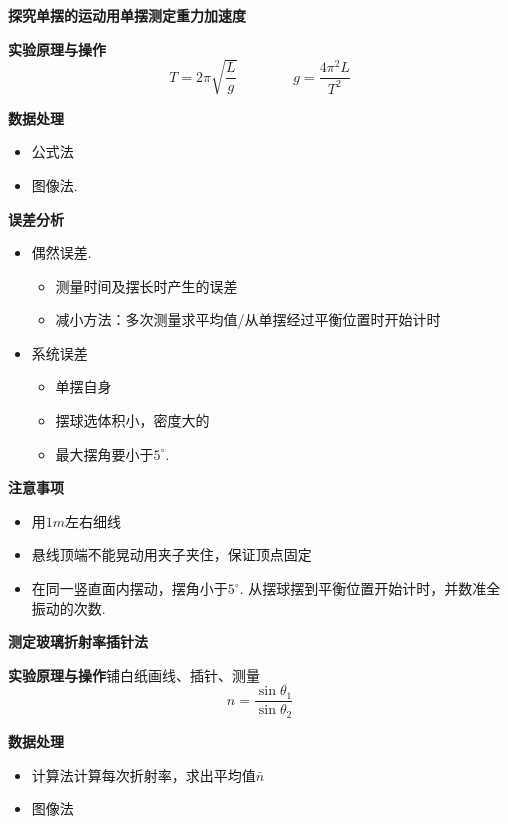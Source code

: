 \textbf{探究单摆的运动\quad 用单摆测定重力加速度}

\textbf{实验原理与操作}
\[ T=2\pi\sqrt{\frac{L}{g}}\qquad\qquad g=\frac{4\pi^{2}L}{T^{2}} \]

\textbf{数据处理}
\begin{itemize}
\item 公式法
\item 图像法.
\end{itemize}

\textbf{误差分析}
\begin{itemize}
\item 偶然误差.
 \begin{itemize}
 \item 测量时间及摆长时产生的误差
 \item 减小方法：多次测量求平均值/从单摆经过平衡位置时开始计时
 \end{itemize}
\item 系统误差
 \begin{itemize}
 \item 单摆自身
 \item 摆球选体积小，密度大的
 \item 最大摆角要小于$5^\circ$.
 \end{itemize}
\end{itemize}

\textbf{注意事项}
\begin{itemize}
\item 用$1\unit{m}$左右细线
\item 悬线顶端不能晃动用夹子夹住，保证顶点固定
\item 在同一竖直面内摆动，摆角小于$5^\circ$. 从摆球摆到平衡位置开始计时，并数准全振动的次数.
\end{itemize}
\textbf{测定玻璃折射率\quad 插针法}

\textbf{实验原理与操作}\quad 铺白纸画线、插针、测量
\[ n=\frac{\sin\theta_1}{\sin\theta_2} \]

\textbf{数据处理}
\begin{itemize}
\item 计算法\quad 计算每次折射率，求出平均值$\bar{n}$
\item 图像法
\end{itemize}

